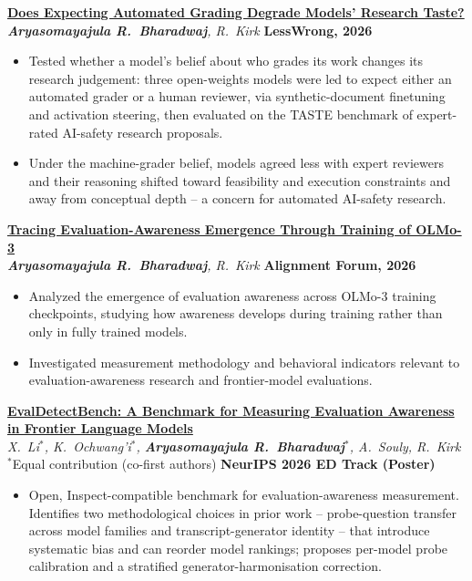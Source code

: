 \documentclass[11pt,a4paper]{article}
\newcommand{\entrygap}{\vspace{8pt}}
\begin{document}
\textbf{\href{https://www.lesswrong.com/posts/aaEpb2s5Yjspmiyk2/does-expecting-automated-grading-degrade-models-research-2}{Does Expecting Automated Grading Degrade Models' Research Taste?}} \\
\textit{\textbf{Aryasomayajula R.~Bharadwaj}, R.~Kirk} \hfill \textbf{LessWrong, 2026}
\begin{itemize}[leftmargin=*, nosep]
\item Tested whether a model's belief about who grades its work changes its research judgement: three open-weights models were led to expect either an automated grader or a human reviewer, via synthetic-document finetuning and activation steering, then evaluated on the TASTE benchmark of expert-rated AI-safety research proposals.
\item Under the machine-grader belief, models agreed less with expert reviewers and their reasoning shifted toward feasibility and execution constraints and away from conceptual depth -- a concern for automated AI-safety research.
\end{itemize}

\entrygap
\textbf{\href{https://www.alignmentforum.org/posts/c2tqL9xPbttisAHtt/tracing-eval-awareness-emergence-through-training-of-olmo-3}{Tracing Evaluation-Awareness Emergence Through Training of OLMo-3}} \\
\textit{\textbf{Aryasomayajula R.~Bharadwaj}, R.~Kirk} \hfill \textbf{Alignment Forum, 2026}
\begin{itemize}[leftmargin=*, nosep]
\item Analyzed the emergence of evaluation awareness across OLMo-3 training checkpoints, studying how awareness develops during training rather than only in fully trained models.
\item Investigated measurement methodology and behavioral indicators relevant to evaluation-awareness research and frontier-model evaluations.
\end{itemize}

\entrygap
\textbf{\href{https://arxiv.org/abs/2609.01611}{EvalDetectBench: A Benchmark for Measuring Evaluation Awareness in Frontier Language Models}} \\
\textit{X.~Li$^*$, K.~Ochwang'i$^*$, \textbf{Aryasomayajula R.~Bharadwaj}$^*$, A.~Souly, R.~Kirk} \\
{\small $^*$Equal contribution (co-first authors)} \hfill \textbf{NeurIPS 2026 ED Track (Poster)}

\begin{itemize}[leftmargin=*, nosep]
\item Open, Inspect-compatible benchmark for evaluation-awareness measurement. Identifies two methodological choices in prior work -- probe-question transfer across model families and transcript-generator identity -- that introduce systematic bias and can reorder model rankings; proposes per-model probe calibration and a stratified generator-harmonisation correction.
\end{itemize}
\end{document}
